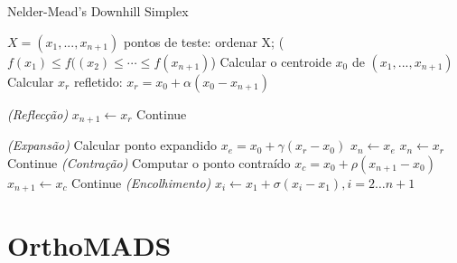 \begin{algorithm}
    \caption{Nelder-Mead's Downhill Simplex}
    \label{alg:nm}
    \begin{algorithmic}[1] %
        \Require $X = (x_1, ... , x_{n+1})$ pontos de teste:
                \State ordenar X; ($f(x _1) \leq f(({x} _2) \leq \cdots \leq f(x_{n+1})$) 
                \State Calcular o centroide $x_0$ de $(x_{1}, ... , x_{n+1})$
                \State Calcular $x_r$ refletido: $x_r = x_0 + \alpha(x_0 - x_{n+1})$ 
                
\BState \emph{(Reflecção)}                
                    \State $x_{n+1} \gets x_r$
                    \State Continue
                \EndIf

\BState \emph{(Expansão)}
                    \State Calcular ponto expandido $x_e = x_0 + \gamma(x_r - x_0) $
                        \State $x_n \gets x_e$
                    \Else
                        \State $x_n \gets x_r$                  
                    \EndIf
                    \State Continue
                \EndIf
\BState \emph{(Contração)}
                \State Computar o ponto contraído $x_c = x_0 + \rho(x_{n+1} - x_0)$
                    \State $x_{n+1} \gets x_c$
                    \State Continue             
                \EndIf
\BState \emph{(Encolhimento)}
                \State $x_i \gets x_1 + \sigma(x_i - x_1), i=2 \dots n+1$
            \EndWhile
    \end{algorithmic}
\end{algorithm}



\section{OrthoMADS}

